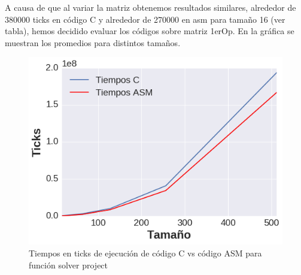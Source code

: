 A causa de que al variar la matriz obtenemos resultados similares, alrededor de 380000 ticks en código C y alrededor de 270000 en asm para tamaño 16 (ver tabla), hemos decidido evaluar los códigos sobre matriz 1erOp. En la gráfica se muestran los promedios para distintos tamaños.
\begin{figure}[h]

\centering
\includegraphics[scale=0.6] {solver_project}
   \caption{Tiempos en ticks de ejecución de código C vs código ASM para función solver project}
\end{figure}




